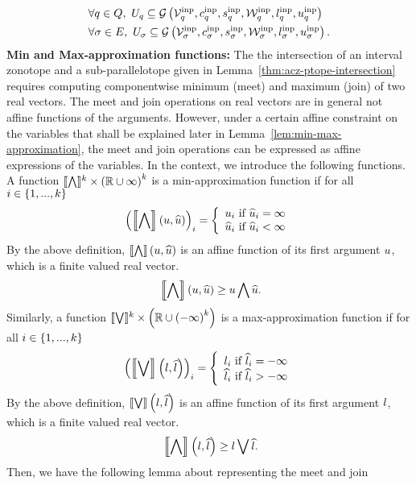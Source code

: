 %
\begin{align}
& \forall
\loc\in\locations,~\inputset_\loc\subseteq\acztope{\inputtemp_\loc}{\inputcen_\loc}{\inputsfact_\loc}{\inputstemp_\loc}{\inputlb_\loc}{\inputub_\loc}\\
& \forall \edge\in\edgeset,~\inputset_\edge\subseteq\acztope{\inputtemp_\edge}{\inputcen_\edge}{\inputsfact_\edge}{\inputstemp_\edge}{\inputlb_\edge}{\inputub_\edge}.
\end{align}
%
{\bf Min and Max-approximation functions:} The
the intersection of an interval zonotope and a
sub-parallelotope given in Lemma~\ref{thm:acz-ptope-intersection}
requires computing componentwise minimum (meet) and maximum (join) of
two real vectors.  The meet and join operations on real vectors are in
general not affine functions of the arguments.  However, under a
certain affine constraint on the variables that shall be explained
later in Lemma~\ref{lem:min-max-approximation}, the meet and join operations can be
expressed as affine expressions of the variables.  In the context, we
introduce the following functions.  A function
$\minapproxsymbol:\reals^k\times\lt(\reals\cup\infty\rt)^k$ is a
min-approximation function if for all $i\in\set{1,...,k}$
%
\[
\lt(\minapprox{\ub}{\pub}\rt)_i=
\lt\{
\begin{array}{l}
\ub_i~\text{if}~\pub_i=\infty\\
\pub_i~\text{if}~\pub_i<\infty
\end{array}
\rt.
\]
%
By the above definition, $\minapprox{\ub}{\pub}$ is an affine function of its
first argument $\ub$, which is a finite valued real vector.
%
\begin{equation}~\label{eqn:minapprox}
\minapprox{\ub}{\pub}\geq\meet{\ub}{\pub}.
\end{equation}
%
Similarly, a function
$\maxapproxsymbol:\reals^k\times\lt(\reals\cup\lt(-\infty\rt)^k\rt)$
is a max-approximation function if for all $i\in\set{1,...,k}$
%
\[
\lt(\maxapprox{\lb}{\plb}\rt)_i=
\lt\{
\begin{array}{l}
\lb_i~\text{if}~\plb_i=-\infty\\
\plb_i~\text{if}~\plb_i>-\infty
\end{array}
\rt.
\]
%
By the above definition, $\maxapprox{\lb}{\plb}$ is an affine function
of its first argument $\lb$, which is a finite valued real vector.
%
\begin{equation}~\label{eqn:minapprox}
\minapprox{\lb}{\plb}\geq\join{\lb}{\plb}.
\end{equation}
%
Then, we have the following lemma about representing the meet and join
